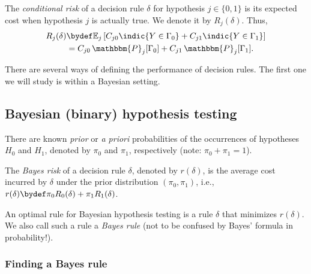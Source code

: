\documentclass[12pt]{report}
\begin{document}
\begin{defn}
The {\em conditional risk} of a decision rule $\delta$ for hypothesis $j \in \{0,1\}$ is its expected cost when hypothesis $j$ is actually true. We denote it by $R_j(\delta)$. Thus, 
\begin{align*}
R_j(\delta) &\bydef \mathbb{E}_j\left[ C_{j0}\indic{Y \in \Gamma_0} + C_{j1}\indic{Y \in \Gamma_1} \right] \\
&= C_{j0} \, \mathbbm{P}_j[\Gamma_0] + C_{j1} \, \mathbbm{P}_j[\Gamma_1].
\end{align*}
\end{defn}

There are several ways of defining the performance of decision rules. The first one we will study is within a Bayesian setting.

\subsection{Bayesian (binary) hypothesis testing}
\begin{assum}
There are known {\em prior} or {\em a priori} probabilities of the occurrences of hypotheses $H_0$ and $H_1$, denoted by $\pi_0$ and $\pi_1$, respectively (note: $\pi_0 + \pi_1 = 1$).
\end{assum}

\begin{defn}
The {\em Bayes risk} of a decision rule $\delta$, denoted by $r(\delta)$, is the average cost incurred by $\delta$ under the prior distribution $(\pi_0, \pi_1)$, i.e., $r(\delta) \bydef \pi_0 R_0(\delta) + \pi_1 R_1(\delta)$.
\end{defn}

\begin{defn}
An optimal rule for Bayesian hypothesis testing is a rule $\delta$ that minimizes $r(\delta)$. We also call such a rule a {\em Bayes rule} (not to be confused by Bayes' formula in probability!). 
\end{defn}

\subsubsection{Finding a Bayes rule}
\end{document}
